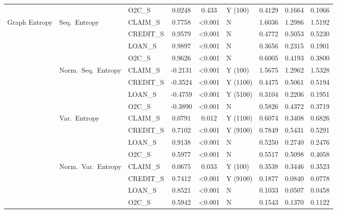 \begin{longtable}{lllcclccc}
 &  & O2C\_S & 0.0248 & 0.433 & Y (100) & 0.4129 & 0.1664 & 0.1066 \\
\cmidrule(lr){1-9}
Graph Entropy & Seq.\ Entropy & CLAIM\_S & 0.7758 & <0.001 & N & 1.6036 & 1.2986 & 1.5192 \\
 &  & CREDIT\_S & 0.9579 & <0.001 & N & 0.4772 & 0.5053 & 0.5230 \\
 &  & LOAN\_S & 0.9897 & <0.001 & N & 0.3656 & 0.2315 & 0.1901 \\
 &  & O2C\_S & 0.9626 & <0.001 & N & 0.6005 & 0.4193 & 0.3800 \\
\cmidrule(lr){2-9}
 & Norm.\ Seq.\ Entropy & CLAIM\_S & -0.2131 & <0.001 & Y (100) & 1.5675 & 1.2962 & 1.5328 \\
 &  & CREDIT\_S & -0.3524 & <0.001 & Y (1100) & 0.4475 & 0.5061 & 0.5194 \\
 &  & LOAN\_S & -0.4759 & <0.001 & Y (5100) & 0.3104 & 0.2206 & 0.1951 \\
 &  & O2C\_S & -0.3890 & <0.001 & N & 0.5826 & 0.4372 & 0.3719 \\
\cmidrule(lr){2-9}
 & Var.\ Entropy & CLAIM\_S & 0.0791 & 0.012 & Y (1100) & 0.6074 & 0.3408 & 0.6826 \\
 &  & CREDIT\_S & 0.7102 & <0.001 & Y (9100) & 0.7849 & 0.5431 & 0.5291 \\
 &  & LOAN\_S & 0.9138 & <0.001 & N & 0.5250 & 0.2740 & 0.2476 \\
 &  & O2C\_S & 0.5977 & <0.001 & N & 0.5517 & 0.5098 & 0.4058 \\
\cmidrule(lr){2-9}
 & Norm.\ Var.\ Entropy & CLAIM\_S & 0.0675 & 0.033 & Y (100) & 0.3538 & 0.3446 & 0.3523 \\
 &  & CREDIT\_S & 0.7412 & <0.001 & Y (9100) & 0.1877 & 0.0840 & 0.0778 \\
 &  & LOAN\_S & 0.8521 & <0.001 & N & 0.1033 & 0.0507 & 0.0458 \\
 &  & O2C\_S & 0.5942 & <0.001 & N & 0.1543 & 0.1370 & 0.1122 \\

\bottomrule
\end{longtable}